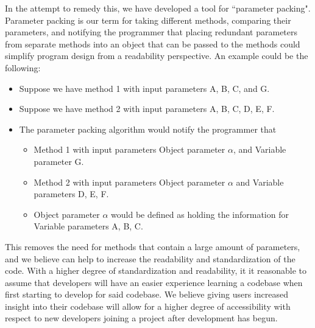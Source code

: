 \documentclass{article}
\begin{document}
In the attempt to remedy this, we have developed a tool for ``parameter packing". Parameter packing is our term for taking different methods, comparing their parameters, and notifying the programmer that placing redundant parameters from separate methods into an object that can be passed to the methods could simplify program design from a readability perspective. An example could be the following:

\begin{itemize}
    \item Suppose we have method 1 with input parameters A, B, C, and G.
    \item Suppose we have method 2 with input parameters A, B, C, D, E, F.
    \item The parameter packing algorithm would notify the programmer that
    \begin{itemize}
        \item Method 1 with input parameters Object parameter $\alpha$, and Variable parameter G.
        \item Method 2 with input parameters Object parameter $\alpha$ and Variable parameters D, E, F.
        \item Object parameter $\alpha$ would be defined as holding the information for Variable parameters A, B, C.
    \end{itemize}
\end{itemize}
This removes the need for methods that contain a large amount of parameters, and we believe can help to increase the readability and standardization of the code. With a higher degree of standardization and readability, it it reasonable to assume that developers will have an easier experience learning a codebase when first starting to develop for said codebase. We believe giving users increased insight into their codebase will allow for a higher degree of accessibility with respect to new developers joining a project after development has begun.
\end{document}
